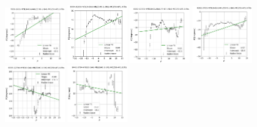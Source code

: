 \documentclass[fleqn,usenatbib]{mnras}
\begin{document}
\begin{figure}
    \centering
    \includegraphics[width=0.23\textwidth]{Images/LINFITS/CC0-7958-1901-LINFIT-EBARS-MASKED.png}
    \includegraphics[width=0.23\textwidth]{Images/LINFITS/CC0-8084-6103-LINFIT-EBARS-MASKED.png}
    \includegraphics[width=0.23\textwidth]{Images/LINFITS/CC0-8262-12701-LINFIT-EBARS-MASKED.png}
    \includegraphics[width=0.23\textwidth]{Images/LINFITS/CC0-8262-3703-LINFIT-EBARS-MASKED.png}
    \includegraphics[width=0.23\textwidth]{Images/LINFITS/CC0-8335-12704-LINFIT-EBARS-MASKED.png}
    \includegraphics[width=0.23\textwidth]{Images/LINFITS/CC0-8442-3704-LINFIT-EBARS-MASKED.png}

\end{figure}
\end{document}
